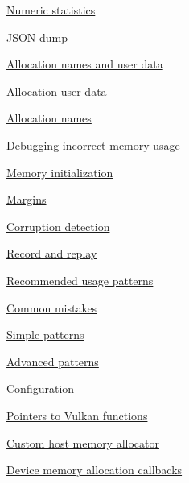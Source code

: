 \begin{DoxyItemize}
\begin{DoxyItemize}
\begin{DoxyItemize}
\item \hyperlink{statistics_statistics_numeric_statistics}{Numeric statistics}
\item \hyperlink{statistics_statistics_json_dump}{J\+S\+ON dump}
\end{DoxyItemize}
\item \hyperlink{allocation_annotation}{Allocation names and user data}
\begin{DoxyItemize}
\item \hyperlink{allocation_annotation_allocation_user_data}{Allocation user data}
\item \hyperlink{allocation_annotation_allocation_names}{Allocation names}
\end{DoxyItemize}
\item \hyperlink{debugging_memory_usage}{Debugging incorrect memory usage}
\begin{DoxyItemize}
\item \hyperlink{debugging_memory_usage_debugging_memory_usage_initialization}{Memory initialization}
\item \hyperlink{debugging_memory_usage_debugging_memory_usage_margins}{Margins}
\item \hyperlink{debugging_memory_usage_debugging_memory_usage_corruption_detection}{Corruption detection}
\end{DoxyItemize}
\item \hyperlink{record_and_replay}{Record and replay}
\end{DoxyItemize}
\item \hyperlink{usage_patterns}{Recommended usage patterns}
\begin{DoxyItemize}
\item \hyperlink{usage_patterns_usage_patterns_common_mistakes}{Common mistakes}
\item \hyperlink{usage_patterns_usage_patterns_simple}{Simple patterns}
\item \hyperlink{usage_patterns_usage_patterns_advanced}{Advanced patterns}
\end{DoxyItemize}
\item \hyperlink{configuration}{Configuration}
\begin{DoxyItemize}
\item \hyperlink{configuration_config_Vulkan_functions}{Pointers to Vulkan functions}
\item \hyperlink{configuration_custom_memory_allocator}{Custom host memory allocator}
\item \hyperlink{configuration_allocation_callbacks}{Device memory allocation callbacks}

\end{DoxyItemize}
\end{DoxyItemize}
